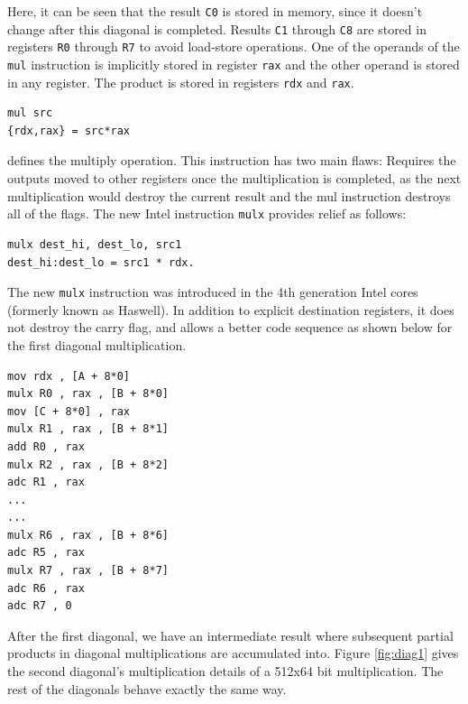 \documentclass[twocolumn]{svjour3}          %
\begin{document}
Here, it can be seen that the result \texttt{C0} is stored in memory, since it doesn't change after this diagonal is completed. Results \texttt{C1} through \texttt{C8} are stored in registers \texttt{R0} through \texttt{R7} to avoid load-store operations. One of the operands of the \texttt{mul} instruction is implicitly stored in register \texttt{rax} and the other operand is stored in any register. The product is stored in registers \texttt{rdx} and \texttt{rax}. 
\begin{verbatim}
mul src
{rdx,rax} = src*rax
\end{verbatim}
defines the multiply operation. This instruction has two main flaws: Requires the outputs moved to other registers once the multiplication is completed, as the next multiplication would destroy the current result and the mul instruction destroys all of the flags.
%
The new Intel instruction \texttt{mulx} provides relief as follows:
\begin{verbatim}
mulx dest_hi, dest_lo, src1
dest_hi:dest_lo = src1 * rdx.
\end{verbatim}
The new \texttt{mulx} instruction was introduced in the 4th generation Intel cores (formerly known as Haswell). In addition to explicit destination registers, it does not destroy the carry flag, and allows a better code sequence as shown below for the first diagonal multiplication.
\begin{verbatim}
mov rdx , [A + 8*0]
mulx R0 , rax , [B + 8*0]
mov [C + 8*0] , rax
mulx R1 , rax , [B + 8*1]
add R0 , rax
mulx R2 , rax , [B + 8*2]
adc R1 , rax
...
...
mulx R6 , rax , [B + 8*6]
adc R5 , rax
mulx R7 , rax , [B + 8*7]
adc R6 , rax
adc R7 , 0
\end{verbatim}

After the first diagonal, we have an intermediate result where subsequent partial products in diagonal multiplications are accumulated into. Figure \ref{fig:diag1} gives the second diagonal's multiplication details of a 512x64 bit multiplication. The rest of the diagonals behave exactly the same way.
\end{document}
